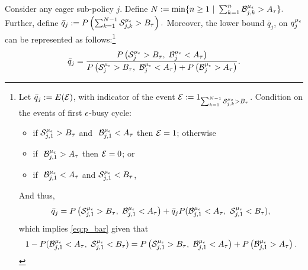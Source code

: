 Consider any eager sub-policy $j$. Define
$N := \min\{n \geq 1\ |\ \sum_{k = 1}^n \mathcal{B}_{j,k}^{{\mu_\epsilon}} > A_{\tau}\}.$
 Further, define
$\bar{q}_j := P\left(\sum_{k = 1}^{N-1} \mathcal{S}_{j,k}^{{\mu_\epsilon}} > B_{{\tau}}\right).$
 Moreover, the lower bound $\bar{q}_j$,
on $q_j^{\mu_\epsilon}$ can be represented as follows:\footnote{Let
  ${\bar q}_j :=E({\cal E})$, with indicator of the event
  ${\cal E} := 1_{ \sum_{k = 1}^{N-1} \mathcal{S}_{j,k}^{{\mu_\epsilon}} > B_{{\tau}} }
  $. Condition on the events of first ${ \epsilon }$-busy cycle:
		\begin{itemize}
		\item 	 if $\mathcal{S}_{j,1}^{{\mu_\epsilon}} > B_{\tau}$ and $\ \mathcal{B}_{j,1}^{{\mu_\epsilon}} < A_{\tau}$ then ${\cal E} = 1$; otherwise 
		\item   if $\ \mathcal{B}_{j,1}^{{\mu_\epsilon}} > A_{\tau}$  then ${\cal E} = 0$;  or  
		\item if $\ \mathcal{B}_{j,1}^{{\mu_\epsilon}} < A_{\tau}$ and
                  $\mathcal{S}_{j,1}^{{\mu_\epsilon}} < B_{\tau}$, 
\end{itemize}			
		And thus, 
		$$
		\bar{q}_j = P\left(\mathcal{S}^{{\mu_\epsilon}}_{j,1} >
			B_{\tau},\ \mathcal{B}^{{\mu_\epsilon}}_{j,1} < A_{\tau}\right) + \bar{q}_j  P( \mathcal{B}_{j,1}^{{\mu_\epsilon}}  < A_{\tau} ,  \  \mathcal{S}_{j,1}^{{\mu_\epsilon}} < B_{\tau} ),
		$$
		which implies \eqref{eq:p_bar} given that
		$$1 - P( \mathcal{B}_{j,1}^{{\mu_\epsilon}}  < A_{\tau} ,  \  \mathcal{S}_{j,1}^{{\mu_\epsilon}} < B_{\tau} )  = P\left(\mathcal{S}^{{\mu_\epsilon}}_{j,1} >
		B_{\tau},\ \mathcal{B}^{{\mu_\epsilon}}_{j,1} < A_{\tau}\right) + P\left(\mathcal{B}^{{\mu_\epsilon}}_{j,1} > A_{\tau}\right).$$}
\begin{equation}
\label{eq:p_bar}
\bar{q}_j =
\frac{P\left(\mathcal{S}^{{\mu_\epsilon}}_j > B_{\tau},\ \mathcal{B}^{{\mu_\epsilon}}_j < A_{\tau}\right)}{P\left(\mathcal{S}^{{\mu_\epsilon}}_j >
		B_{\tau},\ \mathcal{B}^{{\mu_\epsilon}}_j < A_{\tau}\right) + P\left(\mathcal{B}^{{\mu_\epsilon}}_j > A_{\tau}\right)}.    
\end{equation}
